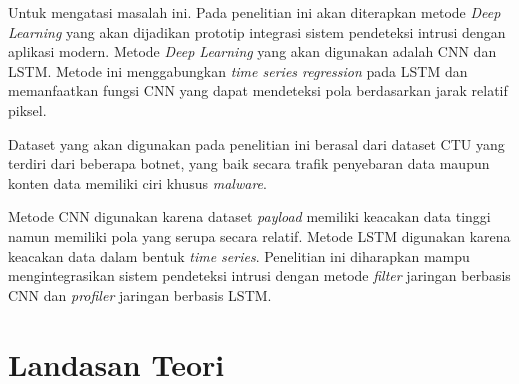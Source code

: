 \documentclass[./skripsi.tex]{subfiles}
\begin{document}
\par Untuk mengatasi masalah ini. Pada penelitian ini akan diterapkan metode \textit{Deep Learning} yang akan dijadikan prototip integrasi sistem pendeteksi intrusi dengan aplikasi modern. Metode \textit{Deep Learning} yang akan digunakan adalah CNN dan LSTM. Metode ini menggabungkan \textit{time series regression} pada LSTM dan memanfaatkan fungsi CNN yang dapat mendeteksi pola berdasarkan jarak relatif piksel.
\par Dataset yang akan digunakan pada penelitian ini berasal dari dataset CTU yang terdiri dari beberapa botnet, yang baik secara trafik penyebaran data maupun konten data memiliki ciri khusus \textit{malware}.
\par Metode CNN digunakan karena dataset \textit{payload} memiliki keacakan data tinggi namun memiliki pola yang serupa secara relatif. Metode LSTM digunakan karena keacakan data dalam bentuk \textit{time series}. Penelitian ini diharapkan mampu mengintegrasikan sistem pendeteksi intrusi dengan metode \textit{filter} jaringan berbasis CNN dan \textit{profiler} jaringan berbasis LSTM.

\section{Landasan Teori}\label{bab2:landasanteori}
\end{document}
